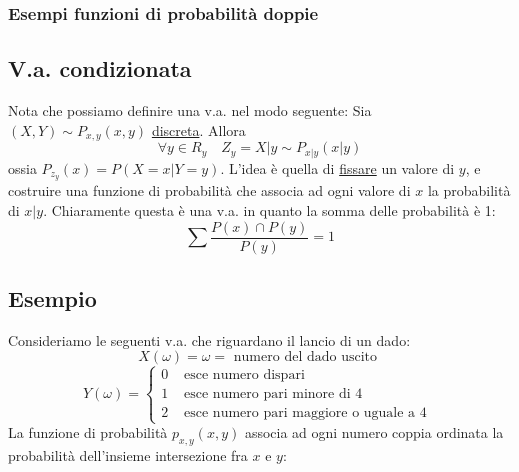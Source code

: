 \subsubsection*{Esempi funzioni di probabilità doppie}
\subsection{V.a. condizionata}
Nota che possiamo definire una v.a. nel modo seguente:
\vskip3mm
Sia $ \left(X, Y\right) \sim P_{x,y} \left(x,y\right) $ \underline{discreta}. Allora
\[
	\forall  y \in  R_y \quad Z_y =  X | y \sim P_{x|y} \left(x | y\right)
\]
ossia $ P_{z_y} \left(x\right) = P\left(X = x | Y = y\right) $. L'idea è quella di \underline{fissare} un valore di $ y $, e costruire una funzione di probabilità che associa ad ogni valore di $ x $ la probabilità di $ x | y $. Chiaramente questa è una v.a. in quanto la somma delle probabilità è 1:
\[
	\sum \frac{P\left(x\right) \cap   P\left(y\right)}{P\left(y\right)} = 1
\]

\subsection{Esempio}
\label{Esempio dado}
Consideriamo le seguenti v.a. che riguardano il lancio di un dado:
\[
	X \left(\omega \right) = \omega  = \text{ numero del dado uscito }
\]
\[
	Y\left(\omega \right) =
	\begin{cases}
		0 & \text{ esce numero dispari }                    \\
		1 & \text{ esce numero pari minore di 4 }           \\
		2 & \text{ esce numero pari maggiore o uguale a 4 }
	\end{cases}
\]
La funzione di probabilità $ p_{x,y} \left(x,y\right) $ associa ad ogni numero coppia ordinata la probabilità dell'insieme intersezione fra $ x $ e $ y $:

